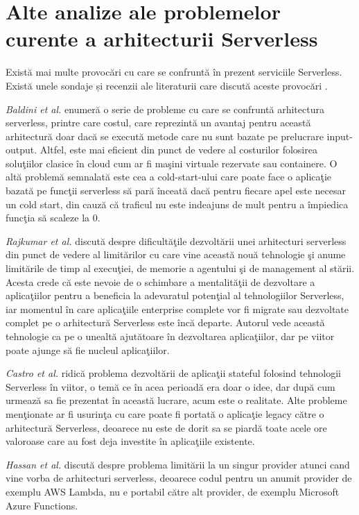 \section{Alte analize ale problemelor curente a arhitecturii Serverless}
\quad Există mai multe provocări cu care se confruntă în prezent serviciile Serverless. Există unele sondaje și recenzii ale literaturii care discută aceste provocări \cite{baldini2017,rajkumar2017,paul2019,hassan2017,jonas2019}.
\par\emph{Baldini et al.} \cite{baldini2017} enumeră o serie de probleme cu care se confruntă arhitectura serverless, printre care costul, care reprezintă un avantaj pentru această arhitectură doar dacă se execută metode care nu sunt bazate pe prelucrare input-output. Altfel, este mai eficient din punct de vedere al costurilor folosirea soluţiilor clasice în cloud cum ar fi maşini virtuale rezervate sau containere. O altă problemă semnalată este cea a cold-start-ului care poate face o aplicaţie bazată pe funcţii serverless să pară înceată dacă pentru fiecare apel este necesar un cold start, din cauză că traficul nu este indeajuns de mult pentru a împiedica funcţia să scaleze la 0. 
\par\emph{Rajkumar et al.} \cite{rajkumar2017} discută despre dificultăţile dezvoltării unei arhitecturi serverless din punct de vedere al limitărilor cu care vine această nouă tehnologie şi anume limitările de timp al execuţiei, de memorie a agentului şi de management al stării. Acesta crede că este nevoie de o schimbare a mentalităţii de dezvoltare a aplicaţiilor pentru a beneficia la adevaratul potenţial al tehnologiilor Serverless, iar momentul în care aplicaţiile enterprise complete vor fi migrate sau dezvoltate complet pe o arhitectură Serverless este încă departe. Autorul vede această tehnologie ca pe o unealtă ajutătoare în dezvoltarea aplicaţiilor, dar pe viitor poate ajunge să fie nucleul aplicaţiilor.  
\par\emph{Castro et al.} \cite{paul2019} ridică problema dezvoltării de aplicaţii stateful folosind tehnologii Serverless în viitor, o temă ce în acea perioadă era doar o idee, dar după cum urmează sa fie prezentat în această lucrare, acum este o realitate. Alte probleme menţionate ar fi usurinţa cu care poate fi portată o aplicaţie legacy către o arhitectură Serverless, deoarece nu este de dorit sa se piardă toate acele ore valoroase care au fost deja investite în aplicaţiile existente. 
\par\emph{Hassan et al.} \cite{hassan2017} discută despre problema limitării la un singur provider atunci cand vine vorba de arhitecturi serverless, deoarece codul pentru un anumit provider de exemplu AWS Lambda, nu e portabil către alt provider, de exemplu Microsoft Azure Functions. 
